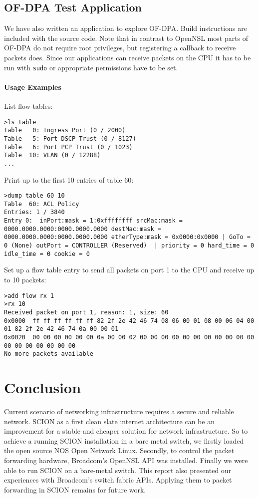 \documentclass[a4paper]{article}
\begin{document}
\subsection{OF-DPA Test Application} \label{sec:ofdpa_test_app}
We have also written an application to explore OF-DPA. Build instructions are included with the source code. Note that in contrast to OpenNSL most parts of OF-DPA do not require root privileges, but registering a callback to receive packets does. Since our applications can receive packets on the CPU it has to be run with \texttt{sudo} or appropriate permissions have to be set.

\paragraph{Usage Examples}
List flow tables:
\begin{lstlisting}
>ls table
Table   0: Ingress Port (0 / 2000)
Table   5: Port DSCP Trust (0 / 8127)
Table   6: Port PCP Trust (0 / 1023)
Table  10: VLAN (0 / 12288)
...
\end{lstlisting}

Print up to the first 10 entries of table 60:
\begin{lstlisting}[breaklines=true]
>dump table 60 10
Table  60: ACL Policy
Entries: 1 / 3840
Entry 0:  inPort:mask = 1:0xffffffff srcMac:mask = 0000.0000.0000:0000.0000.0000 destMac:mask = 0000.0000.0000:0000.0000.0000 etherType:mask = 0x0000:0x0000 | GoTo = 0 (None) outPort = CONTROLLER (Reserved)  | priority = 0 hard_time = 0 idle_time = 0 cookie = 0
\end{lstlisting}

Set up a flow table entry to send all packets on port 1 to the CPU and receive up to 10 packets:
\begin{lstlisting}[breaklines=true]
>add flow rx 1
>rx 10
Received packet on port 1, reason: 1, size: 60
0x0000  ff ff ff ff ff ff 82 2f 2e 42 46 74 08 06 00 01 08 00 06 04 00 01 82 2f 2e 42 46 74 0a 00 00 01
0x0020  00 00 00 00 00 00 0a 00 00 02 00 00 00 00 00 00 00 00 00 00 00 00 00 00 00 00 00 00
No more packets available
\end{lstlisting}


\section{Conclusion}
Current scenario of networking infrastructure requires a secure and reliable network. SCION as a first clean slate internet architecture can be an improvement for a stable and cheaper solution for network infrastructure. So to achieve a running SCION installation in a bare metal switch, we firstly loaded the open source NOS Open Network Linux. Secondly, to control the packet forwarding hardware, Broadcom's OpenNSL API was installed. Finally we were able to run SCION on a bare-metal switch. This report also presented our experiences with Broadcom's switch fabric APIs. Applying them to packet forwarding in SCION remains for future work.
\end{document}
